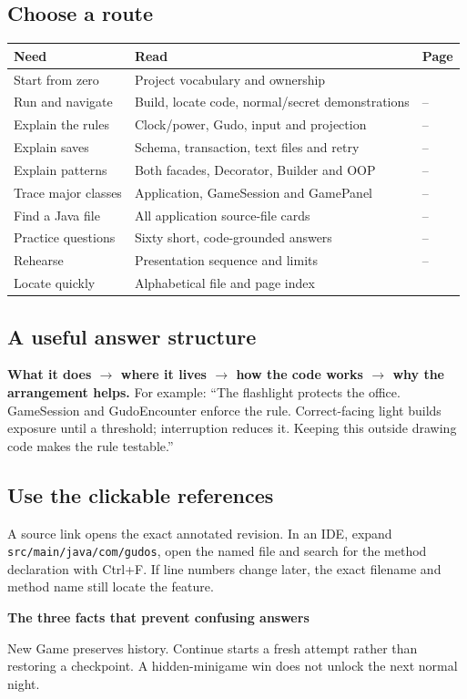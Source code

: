 \documentclass[11pt,a4paper]{article}
\newcommand{\code}[1]{\nolinkurl{#1}}
\newcommand{\note}[2]{\begin{tcolorbox}[enhanced,colback=Pale,colframe=Line,boxrule=0.4pt,arc=1mm,left=7pt,right=7pt,top=5pt,bottom=5pt]\textbf{#1}\par#2\end{tcolorbox}}
\begin{document}
\subsection*{Choose a route}
\par\noindent\begin{tabularx}{\linewidth}{L{.27\linewidth}XL{.13\linewidth}}\toprule
\textbf{Need}&\textbf{Read}&\textbf{Page}\\\midrule
Start from zero&Project vocabulary and ownership&\pageref{p:overview}\\
Run and navigate&Build, locate code, normal/secret demonstrations&\pageref{p:run}--\pageref{p:secret}\\
Explain the rules&Clock/power, Gudo, input and projection&\pageref{p:rules}--\pageref{p:render}\\
Explain saves&Schema, transaction, text files and retry&\pageref{p:data}--\pageref{p:save}\\
Explain patterns&Both facades, Decorator, Builder and OOP&\pageref{p:facade}--\pageref{p:builder}\\
Trace major classes&Application, GameSession and GamePanel&\pageref{p:application}--\pageref{p:gamepanel}\\
Find a Java file&All application source-file cards&\pageref{p:files-1}--\pageref{p:files-14}\\
Practice questions&Sixty short, code-grounded answers&\pageref{p:qa-1}--\pageref{p:qa-6}\\
Rehearse&Presentation sequence and limits&\pageref{p:rehearse}--\pageref{p:limits}\\
Locate quickly&Alphabetical file and page index&\pageref{p:index}\\\bottomrule
\end{tabularx}\par
\subsection*{A useful answer structure}
\textbf{What it does $\rightarrow$ where it lives $\rightarrow$ how the code works $\rightarrow$ why the arrangement helps.}
For example: ``The flashlight protects the office. GameSession and GudoEncounter enforce the rule. Correct-facing light builds exposure until a threshold; interruption reduces it. Keeping this outside drawing code makes the rule testable.''
\subsection*{Use the clickable references}
A source link opens the exact annotated revision. In an IDE, expand \code{src/main/java/com/gudos}, open the named file and search for the method declaration with Ctrl+F. If line numbers change later, the exact filename and method name still locate the feature.
\note{The three facts that prevent confusing answers}{New Game preserves history. Continue starts a fresh attempt rather than restoring a checkpoint. A hidden-minigame win does not unlock the next normal night.}
\end{document}
